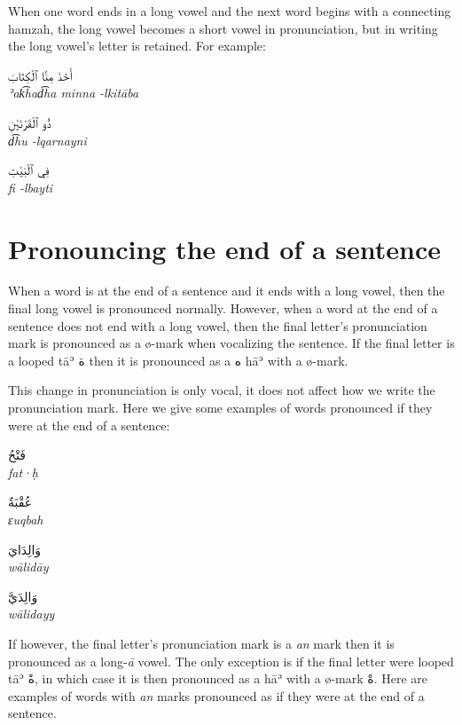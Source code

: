\documentclass[
  10pt,
]{book}
\begin{document}
When one word ends in a long vowel and the next word begins with a connecting hamzah, the long vowel becomes a short vowel in pronunciation, but in writing the long vowel's letter is retained. For example:

\foreignlanguage{arabic}{أَخَذَ مِنَّا ٱلْکِتَابَ}\\
\emph{ʾak͡had͡ha minna -lkitāba}

\foreignlanguage{arabic}{ذُو ٱلْقَرْنَيْنِ}\\
\emph{d͡hu -lqarnayni}

\foreignlanguage{arabic}{فِي ٱلْبَيْتِ}\\
\emph{fi -lbayti}

\section{Pronouncing the end of a sentence}\label{pronouncing-the-end-of-a-sentence}

When a word is at the end of a sentence and it ends with a long vowel, then the final long vowel is pronounced normally. However, when a word at the end of a sentence does not end with a long vowel, then the final letter's pronunciation mark is pronounced as a ø-mark when vocalizing the sentence. If the final letter is a looped tāʾ \foreignlanguage{arabic}{ة} then it is pronounced as a \foreignlanguage{arabic}{ه} hāʾ with a ø-mark.

This change in pronunciation is only vocal, it does not affect how we write the pronunciation mark. Here we give some examples of words pronounced if they were at the end of a sentence:

\foreignlanguage{arabic}{فَتْحُ}\\
\emph{fat·ḥ}

\foreignlanguage{arabic}{عُقْبَةٌ}\\
\emph{ɛuqbah}

\foreignlanguage{arabic}{وَالِدَايَ}\\
\emph{wālidāy}

\foreignlanguage{arabic}{وَالِدَيَّ}\\
\emph{wālidayy}

If however, the final letter's pronunciation mark is a \emph{an} mark then it is pronounced as a long-\emph{ā} vowel. The only exception is if the final letter were looped tāʾ \foreignlanguage{arabic}{ةً}, in which case it is then pronounced as a hāʾ with a ø-mark \foreignlanguage{arabic}{هْ}. Here are examples of words with \emph{an} marks pronounced as if they were at the end of a sentence.
\end{document}
